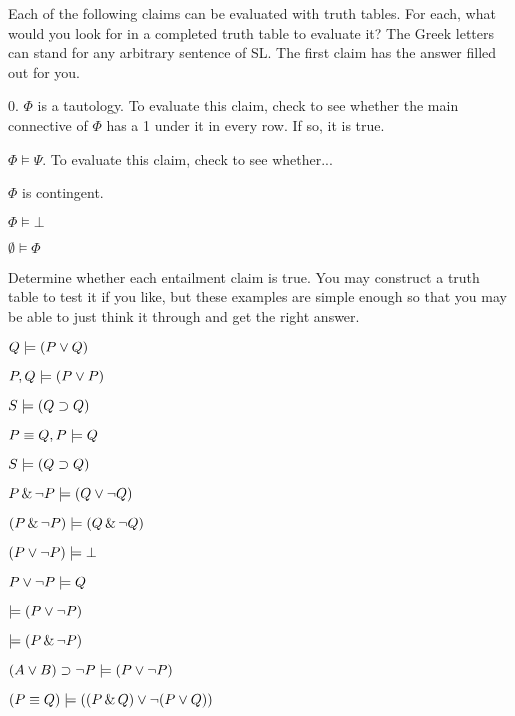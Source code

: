 \practiceproblems



\problempart
\label{HW3.C}
Each of the following claims can be evaluated with truth tables. For each, what would you look for in a completed truth table to evaluate it? The Greek letters can stand for any arbitrary sentence of SL. The first claim has the answer filled out for you.

\begin{earg}
		\item[0.] $\Phi$ is a tautology.
		To evaluate this claim, check to see whether the main connective of $\Phi$ has a 1 under it in every row. If so, it is true.
		\item $\Phi \models \Psi$. 
		To evaluate this claim, check to see whether... 
		
		\item $\Phi$ is contingent.
\item $\Phi \models \bot$
		\item $\emptyset \models \Phi$
	\end{earg}


\problempart
Determine whether each entailment claim is true. You may construct a truth table to test it if you like, but these examples are simple enough so that you may be able to just think it through and get the right answer.
\begin{earg}
\item $Q \models (P \vee Q)$
\item $P, Q \models (P \vee P)$
\item $S \models (Q \supset Q)$
\item $P \equiv Q, P \models Q$ %
\item $S \models (Q \supset Q)$   %
\item $P \,\&\, \neg P \models (Q \vee \neg Q)$%
\item $(P \,\&\, \neg P) \models (Q \,\&\, \neg Q)$
\item $(P \vee \neg P) \models \bot$
\item $P \vee \neg P \models Q$%
\item $\models (P \vee \neg P)$
\item $\models (P \,\&\, \neg P)$
\item $(A \vee B) \supset \neg P \models (P \vee \neg P)$
\item $(P \equiv Q) \models ((P \,\&\, Q) \vee \neg (P \vee Q))$
\end{earg}

